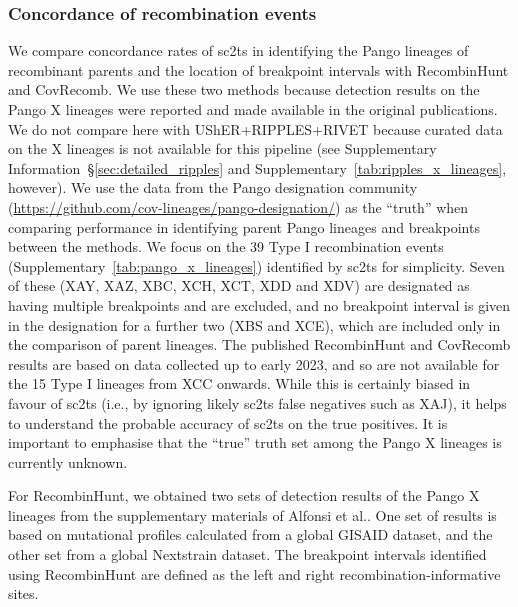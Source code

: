 \documentclass[12pt]{article}
\newcommand{\supref}[1]{Supplementary Information~\S\ref{#1}}
\newcommand{\siref}[1]{Supplementary~\ref{#1}}
\begin{document}
\subsubsection*{Concordance of recombination events}
We compare concordance rates of sc2ts in identifying the
Pango lineages of recombinant parents and the location
of breakpoint intervals with RecombinHunt\cite{Alfonsi2024} and
CovRecomb\cite{Li2024CovRecomb}.
We use these two methods because detection
results on the Pango X lineages were reported and made available
in the original publications. We do not compare here with
UShER+RIPPLES+RIVET because curated data on the X lineages is
not available for this pipeline (see \supref{sec:detailed_ripples}
and \siref{tab:ripples_x_lineages}, however).
We use the data from the Pango designation community
(\url{https://github.com/cov-lineages/pango-designation/})
as the ``truth'' when comparing performance in identifying
parent Pango lineages and breakpoints between the methods.
We focus on the 39 Type I recombination events
(\siref{tab:pango_x_lineages}) identified by sc2ts for simplicity.
Seven of these (XAY, XAZ, XBC, XCH, XCT, XDD and XDV) are designated
as having multiple breakpoints and are excluded, and
no breakpoint interval is given in the designation for a further two
(XBS and XCE), which are included only in the comparison of parent lineages.
The published RecombinHunt and CovRecomb results are based on data
collected up to early 2023, and so are not available for
the 15 Type I lineages from XCC onwards.
While this is certainly biased in favour of sc2ts (i.e., by
ignoring likely sc2ts false negatives such as XAJ), it helps to
understand the probable accuracy of sc2ts on the true positives.
It is important to emphasise that the ``true'' truth set among
the Pango X lineages is currently unknown.

For RecombinHunt, we obtained two sets of detection results of the Pango X lineages
from the supplementary materials of Alfonsi et al.\cite{Alfonsi2024}.
One set of results is based on mutational profiles calculated from a global GISAID dataset,
and the other set from a global Nextstrain dataset.
The breakpoint intervals identified using RecombinHunt are defined
as the left and right recombination-informative sites.
\end{document}
